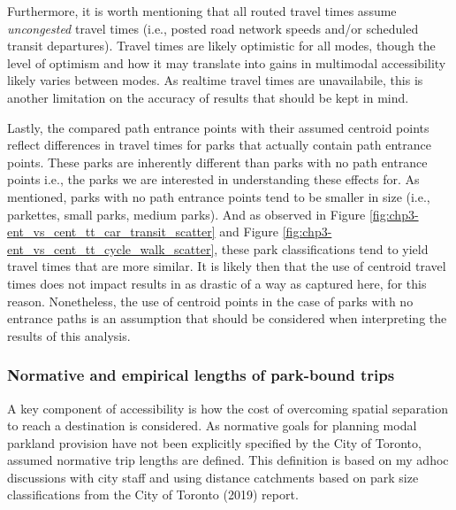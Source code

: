 \documentclass[
11pt, %
oneside, %
english, %
singlespacing, %
]{macthesis} %
\begin{document}
Furthermore, it is worth mentioning that all routed travel times assume \emph{uncongested} travel times (i.e., posted road network speeds and/or scheduled transit departures). Travel times are likely optimistic for all modes, though the level of optimism and how it may translate into gains in multimodal accessibility likely varies between modes. As realtime travel times are unavailabile, this is another limitation on the accuracy of results that should be kept in mind.

Lastly, the compared path entrance points with their assumed centroid points reflect differences in travel times for parks that actually contain path entrance points. These parks are inherently different than parks with no path entrance points i.e., the parks we are interested in understanding these effects for. As mentioned, parks with no path entrance points tend to be smaller in size (i.e., parkettes, small parks, medium parks). And as observed in Figure \ref{fig:chp3-ent_vs_cent_tt_car_transit_scatter} and Figure \ref{fig:chp3-ent_vs_cent_tt_cycle_walk_scatter}, these park classifications tend to yield travel times that are more similar. It is likely then that the use of centroid travel times does not impact results in as drastic of a way as captured here, for this reason. Nonetheless, the use of centroid points in the case of parks with no entrance paths is an assumption that should be considered when interpreting the results of this analysis.

\subsubsection{Normative and empirical lengths of park-bound trips}\label{normative-and-empirical-lengths-of-park-bound-trips}

A key component of accessibility is how the cost of overcoming spatial separation to reach a destination is considered. As normative goals for planning modal parkland provision have not been explicitly specified by the City of Toronto, assumed normative trip lengths are defined. This definition is based on my adhoc discussions with city staff and using distance catchments based on park size classifications from the City of Toronto (2019) report.
\end{document}
